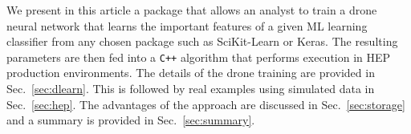 We present in this article a package that allows an analyst to 
train a drone neural network that learns the important features of a 
given ML learning classifier from any chosen package such as SciKit-Learn or Keras.
The resulting parameters are then fed into a {\tt C++} algorithm that
performs execution in HEP production environments. The details of the
drone training are provided in Sec.~\ref{sec:dlearn}. This is followed
by real examples using simulated data in Sec.~\ref{sec:hep}. The advantages
of the approach are discussed in Sec.~\ref{sec:storage} and a summary is 
provided in Sec.~\ref{sec:summary}.
